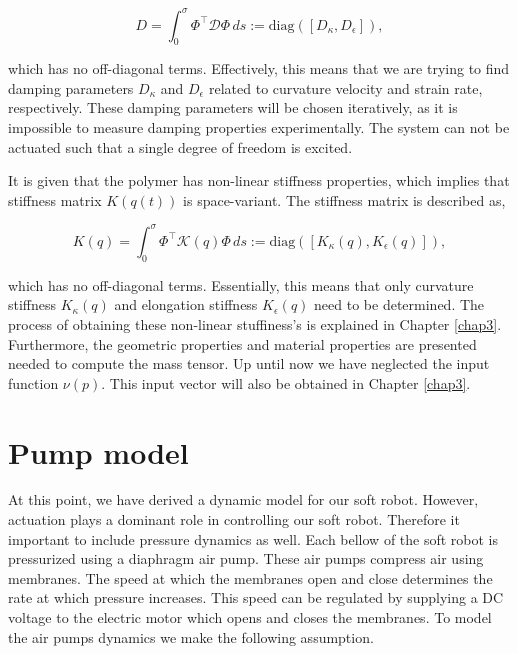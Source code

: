 \begin{equation}
    D = \int_0^\sigma \Phi^\top \mathcal{D} \Phi \hspace{2pt} ds  := \text{diag}([D_\kappa, D_\epsilon]),
\end{equation}

which has no off-diagonal terms. Effectively, this means that we are trying to find damping parameters $D_\kappa$ and $D_\epsilon$ related to curvature velocity and strain rate, respectively. These damping parameters will be chosen iteratively, as it is impossible to measure damping properties experimentally. The system can not be actuated such that a single degree of freedom is excited. 

It is given that the polymer has non-linear stiffness properties, which implies that stiffness matrix $K(q(t))$ is space-variant. The stiffness matrix is described as,

\begin{equation}
    K(q) = \int_0^\sigma \Phi^\top \mathcal{K}(q) \Phi \hspace{2pt} ds := \text{diag}([K_\kappa(q), K_\epsilon(q)]),
\end{equation}

which has no off-diagonal terms. Essentially, this means that only curvature stiffness $K_\kappa(q)$ and elongation stiffness $K_\epsilon(q)$ need to be determined. The process of obtaining these non-linear stuffiness's is explained in Chapter \ref{chap3}. Furthermore, the geometric properties and material properties are presented needed to compute the mass tensor. Up until now we have neglected the input function $\nu(p)$. This input vector will also be obtained in Chapter \ref{chap3}. 




\section{Pump model}

At this point, we have derived a dynamic model for our soft robot. However, actuation plays a dominant role in controlling our soft robot. Therefore it important to include pressure dynamics as well. Each bellow of the soft robot is pressurized using a diaphragm air pump. These air pumps compress air using membranes. The speed at which the membranes open and close determines the rate at which pressure increases. This speed can be regulated by supplying a DC voltage to the electric motor which opens and closes the membranes. To model the air pumps dynamics we make the following assumption.

